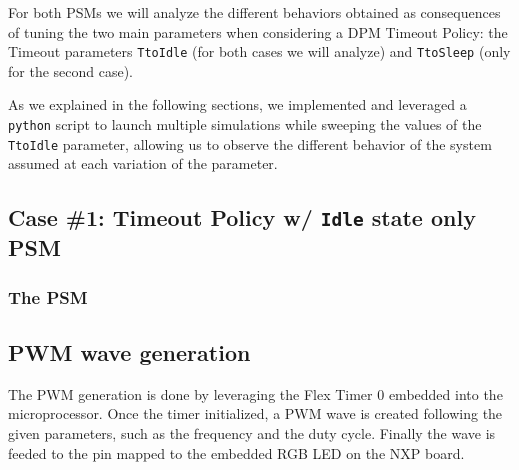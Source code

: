 \documentclass[a4paper]{article}
\begin{document}
        For both PSMs we will analyze the different behaviors obtained as consequences of tuning the two main parameters when considering a DPM Timeout Policy: the Timeout parameters \texttt{TtoIdle} (for both cases we will analyze) and \texttt{TtoSleep} (only for the second case).

        As we explained in the following sections, we implemented and leveraged a \texttt{python} script to launch multiple simulations while sweeping the values of the \texttt{TtoIdle} parameter, allowing us to observe the different behavior of the system assumed at each variation of the parameter.

    \subsection{Case \#1: Timeout Policy w/ \texttt{Idle} state only PSM}
        \subsubsection{The PSM}


        \subsection{PWM wave generation}
        The PWM generation is done by leveraging the Flex Timer 0 embedded into the microprocessor. Once the timer initialized, a PWM wave is created following the given parameters, such as the frequency and the duty cycle. Finally the wave is feeded to the pin mapped to the embedded RGB LED on the NXP board.
\end{document}
